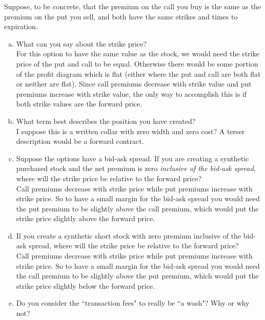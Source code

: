 \documentclass[12pt]{article}
\theoremstyle{plain}
\begin{document}
Suppose, to be concrete, that the premium on the call you buy is the same as the premium on the put you sell, and both have the same strikes and times to expiration.
\begin{enumerate}[(a)]
\item What can you say about the strike price?\\

For this option to have the same value as the stock, we would need the strike price of the put and call to be equal. Otherwise there would be some portion of the profit diagram which is flat (either where the put and call are both flat or neither are flat). Since call premiums decrease with strike value and put premiums increase with strike value, the only way to accomplish this is if both strike values are the forward price.

\item What term best describes the position you have created?\\

I suppose this is a written collar with zero width and zero cost? A terser description would be a forward contract.

\item Suppose the options have a bid-ask spread. If you are creating a synthetic purchased stock and the net premium is zero \emph{inclusive of the bid-ask spread}, where will the strike price be relative to the forward price?\\

Call premiums decrease with strike price while put premiums increase with strike price. So to have a small margin for the bid-ask spread you would need the put premium to be slightly above the call premium, which would put the strike price slightly above the forward price.

\item If you create a synthetic short stock with zero premium inclusive of the bid-ask spread, where will the strike price be relative to the forward price?\\

Call premiums decrease with strike price while put premiums increase with strike price. So to have a small margin for the bid-ask spread you would need the call premium to be slightly above the put premium, which would put the strike price slightly below the forward price.

\item Do you consider the ``transaction fees" to really be ``a wash"? Why or why not?\\


\end{enumerate}
\end{document}

